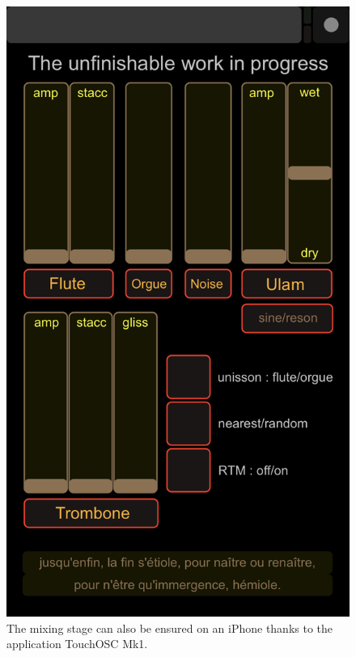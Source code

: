 \documentclass{article}
\begin{document}
\begin{figure}[H]
\centering
\includegraphics[width=\textwidth/2]{../img/9930}
\caption{The mixing stage can also be ensured on an iPhone thanks to the application TouchOSC Mk1\protect\footnotemark.}
\label{iphonemix}
\end{figure}

\end{document}
